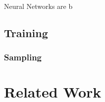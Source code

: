 Neural Networks are b
\subsection{Training}
\label{sec:fund:Train}

\subsubsection{Sampling}
\label{sec:fund:Sampling}

\section{Related Work}
\label{sec:fund:work}
